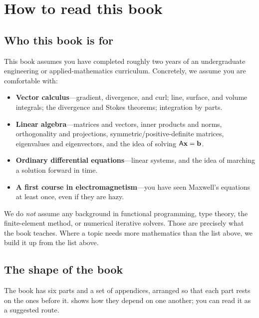 \chapter*{How to read this book}

\section*{Who this book is for}

This book assumes you have completed roughly two years of an undergraduate
engineering or applied-mathematics curriculum. Concretely, we assume you are
comfortable with:

\begin{itemize}[nosep]
  \item \textbf{Vector calculus}---gradient, divergence, and curl; line, surface,
  and volume integrals; the divergence and Stokes theorems; integration by parts.
  \item \textbf{Linear algebra}---matrices and vectors, inner products and norms,
  orthogonality and projections, symmetric/positive-definite matrices,
  eigenvalues and eigenvectors, and the idea of solving $\mathsf{A}\mathbf{x}=\mathbf{b}$.
  \item \textbf{Ordinary differential equations}---linear systems, and the idea
  of marching a solution forward in time.
  \item \textbf{A first course in electromagnetism}---you have seen Maxwell's
  equations at least once, even if they are hazy.
\end{itemize}

We do \emph{not} assume any background in functional programming, type theory,
the finite-element method, or numerical iterative solvers. Those are precisely
what the book teaches. Where a topic needs more mathematics than the list above,
we build it up from the list above.

\section*{The shape of the book}

The book has six parts and a set of appendices, arranged so that each part rests
on the ones before it.  shows how they depend on one another;
you can read it as a suggested route.

